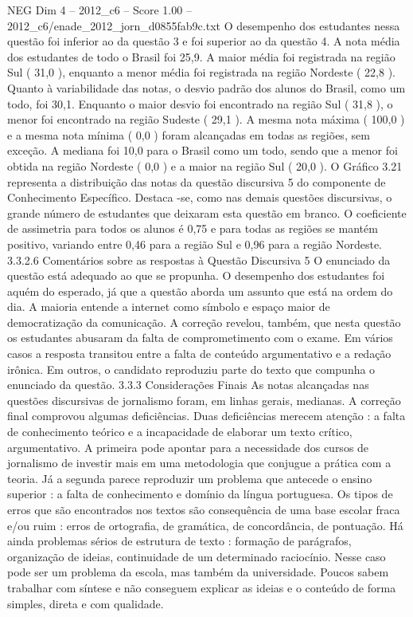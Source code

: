 \begin{textsample}{NEG Dim 4 – 2012\_c6 – Score 1.00 – 2012\_c6/enade\_2012\_jorn\_d0855fab9c.txt}
O desempenho dos estudantes nessa questão foi inferior ao da questão 3 e foi superior ao da questão 4.
A nota média dos estudantes de todo o Brasil foi 25,9.
A maior média foi registrada na região Sul ( 31,0 ), enquanto a menor média foi registrada na região Nordeste ( 22,8 ).
Quanto à variabilidade das notas, o desvio padrão dos alunos do Brasil, como um todo, foi 30,1.
Enquanto o maior desvio foi encontrado na região Sul ( 31,8 ), o menor foi encontrado na região Sudeste ( 29,1 ).
A mesma nota máxima ( 100,0 ) e a mesma nota mínima ( 0,0 ) foram alcançadas em todas as regiões, sem exceção.
A mediana foi 10,0 para o Brasil como um todo, sendo que a menor foi obtida na região Nordeste ( 0,0 ) e a maior na região Sul ( 20,0 ).
O Gráfico 3.21 representa a distribuição das notas da questão discursiva 5 do componente de Conhecimento Específico.
Destaca -se, como nas demais questões discursivas, o grande número de estudantes que deixaram esta questão em branco.
O coeficiente de assimetria para todos os alunos é 0,75 e para todas as regiões se mantém positivo, variando entre 0,46 para a região Sul e 0,96 para a região Nordeste. 3.3.2.6 Comentários sobre as respostas à Questão Discursiva 5 O enunciado da questão está adequado ao que se propunha.
O desempenho dos estudantes foi aquém do esperado, já que a questão aborda um assunto que está na ordem do dia.
A maioria entende a internet como símbolo e espaço maior de democratização da comunicação.
A correção revelou, também, que nesta questão os estudantes abusaram da falta de comprometimento com o exame.
Em vários casos a resposta transitou entre a falta de conteúdo argumentativo e a redação irônica.
Em outros, o candidato reproduziu parte do texto que compunha o enunciado da questão. 3.3.3 Considerações Finais As notas alcançadas nas questões discursivas de jornalismo foram, em linhas gerais, medianas.
A correção final comprovou algumas deficiências.
Duas deficiências merecem atenção : a falta de conhecimento teórico e a incapacidade de elaborar um texto crítico, argumentativo.
A primeira pode apontar para a necessidade dos cursos de jornalismo de investir mais em uma metodologia que conjugue a prática com a teoria.
Já a segunda parece reproduzir um problema que antecede o ensino superior : a falta de conhecimento e domínio da língua portuguesa.
Os tipos de erros que são encontrados nos textos são consequência de uma base escolar fraca e/ou ruim : erros de ortografia, de gramática, de concordância, de pontuação.
Há ainda problemas sérios de estrutura de texto : formação de parágrafos, organização de ideias, continuidade de um determinado raciocínio.
Nesse caso pode ser um problema da escola, mas também da universidade.
Poucos sabem trabalhar com síntese e não conseguem explicar as ideias e o conteúdo de forma simples, direta e com qualidade.

\end{textsample}
